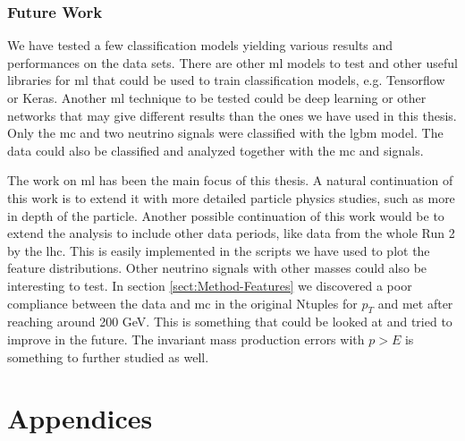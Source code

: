 \documentclass[a4paper, american, 12pt]{report}
\begin{document}
	
	\section{Future Work}
	\label{sect:Conclusion-Future}
	We have tested a few classification models yielding various results and performances on the data sets. There are other \acrshort{ml} models to test and other useful libraries for \acrshort{ml} that could be used to train classification models, e.g. Tensorflow or Keras. Another \acrshort{ml} technique to be tested could be deep learning or other networks that may give different results than the ones we have used in this thesis. Only the \acrshort{mc} and two neutrino signals were classified with the \acrshort{lgbm} model. The data could also be classified and analyzed together with the \acrshort{mc} and signals.
	
	The work on \acrshort{ml} has been the main focus of this thesis. A natural continuation of this work is to extend it with more detailed particle physics studies, such as more in depth of the particle. Another possible continuation of this work would be to extend the analysis to include other data periods, like data from the whole Run 2 by the \acrshort{lhc}. This is easily implemented in the scripts we have used to plot the feature distributions. Other neutrino signals with other masses could also be interesting to test. In section \ref{sect:Method-Features} we discovered a poor compliance between the data and \acrshort{mc} in the original Ntuples for $p_T$ and \acrshort{met} after reaching around 200 GeV. This is something that could be looked at and tried to improve in the future. The invariant mass production errors with $p>E$ is something to further studied as well.

	

	\appendix
	\part{Appendices}
	\label{part:Appendix}
	
\end{document}
